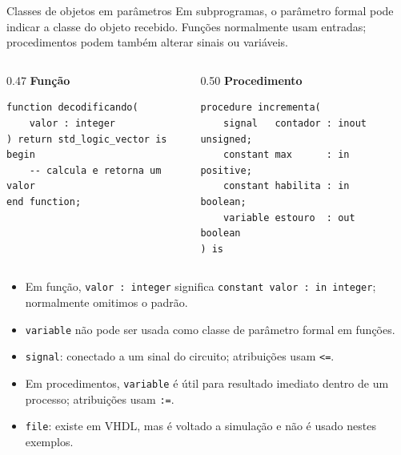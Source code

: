 \documentclass[aspectratio=169,11pt]{beamer}
\begin{document}
\begin{frame}[fragile]{Classes de objetos em parâmetros}
    Em subprogramas, o parâmetro formal pode indicar a classe do objeto recebido. Funções normalmente usam entradas; procedimentos podem também alterar sinais ou variáveis.

\begin{columns}[T,onlytextwidth]
\begin{column}{0.47\textwidth}
\textbf{Função}
\begin{lstlisting}
function decodificando(
    valor : integer
) return std_logic_vector is
begin
    -- calcula e retorna um valor
end function;
\end{lstlisting}
\end{column}

\begin{column}{0.50\textwidth}
\textbf{Procedimento}
\begin{lstlisting}
procedure incrementa(
    signal   contador : inout unsigned;
    constant max      : in    positive;
    constant habilita : in    boolean;
    variable estouro  : out   boolean
) is
\end{lstlisting}
\end{column}
\end{columns}

    \begin{itemize}
        \item Em função, \texttt{valor : integer} significa \texttt{constant valor : in integer}; normalmente omitimos o padrão.
        \item \texttt{variable} não pode ser usada como classe de parâmetro formal em funções.
        \item \texttt{signal}: conectado a um sinal do circuito; atribuições usam \texttt{<=}.
        \item Em procedimentos, \texttt{variable} é útil para resultado imediato dentro de um processo; atribuições usam \texttt{:=}.
        \item \texttt{file}: existe em VHDL, mas é voltado a simulação e não é usado nestes exemplos.
    \end{itemize}
\end{frame}
\end{document}
